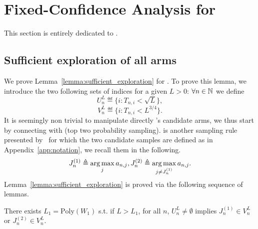 \section{Fixed-Confidence Analysis for \TTTS}\label{app:confidence_ttts}

This section is entirely dedicated to \TTTS.

\subsection{Sufficient exploration of all arms}\label{app:confidence_ttts.exploration}

We prove Lemma~\ref{lemma:sufficient_exploration} for \TTTS. To prove this lemma, we introduce the two following sets of indices for a given $L>0$: $\forall n\in{\mathbb N}$ we define
\[
    U_n^L \eqdef \{i: T_{n,i} < \sqrt{L}\},
\]
\[
    V_n^L \eqdef \{i: T_{n,i} < L^{3/4}\}.
\]
It is seemingly non trivial to manipulate directly \TTTS's candidate arms, we thus start by connecting \TTTS with \TTPS (top two probability sampling). \TTPS is another sampling rule presented by~\cite{russo2016ttts} for which the two candidate samples are defined as in Appendix~\ref{app:notation}, we recall them in the following.
\[
    J_n^{(1)} \triangleq \operatorname*{arg\,max}_{j} a_{n,j}, J_n^{(2)} \triangleq \operatorname*{arg\,max}_{j\neq J_n^{(1)}} a_{n,j}.
\]
Lemma~\ref{lemma:sufficient_exploration} is proved via the following sequence of lemmas.

\begin{lemma}\label{lemma:link_ttps}
    There exists $L_1 = \text{Poly}(W_1)$ s.t. if $L > L_1$, for all $n$, $U_n^L \neq \emptyset$ implies $J_n^{(1)} \in V_n^L$ or $J_n^{(2)} \in V_n^L$.
\end{lemma}


